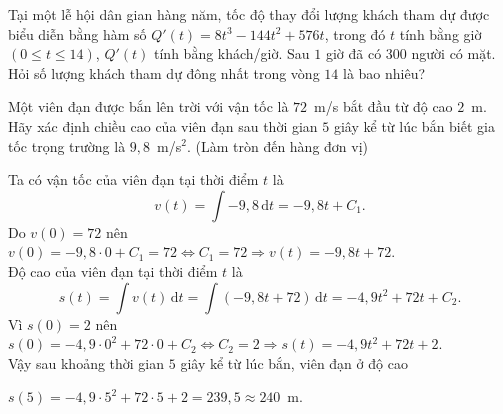 \begin{ex}%
Tại một lễ hội dân gian hàng năm, tốc độ thay đổi lượng khách tham dự được biểu diễn bằng hàm số $Q'(t)=8t^3-144t^2+576t$, trong đó $t$ tính bằng giờ $(0\leq t \leq 14)$, $Q'(t)$ tính bằng khách/giờ. Sau $1$ giờ đã có $300$ người có mặt. Hỏi số lượng khách tham dự đông nhất trong vòng $14$ là bao nhiêu?
\end{ex}

\begin{ex}%
Một viên đạn được bắn lên trời với vận tốc là $72$~m/s bắt đầu từ độ cao $2$~m. Hãy xác định chiều cao của viên đạn sau thời gian $5$ giây kể từ lúc bắn biết gia tốc trọng trường là $9{,}8$~m/s$^2$. (Làm tròn đến hàng đơn vị)
\loigiai
{
Ta có vận tốc của viên đạn tại thời điểm $t$ là \[v(t)=\displaystyle\int -9{,}8\mathrm{\,d}t=-9{,}8t+C_1.\]
Do $v(0)=72$ nên $v(0)=-9{,}8\cdot 0+C_1=72\Leftrightarrow C_1=72\Rightarrow v(t)=-9{,}8t+72$.\\
Độ cao của viên đạn tại thời điểm $t$ là \[s(t)=\displaystyle\int v(t)\mathrm{\,d}t=\displaystyle\int (-9{,}8t+72)\mathrm{\,d}t=-4{,}9t^2+72t+C_2.\]
Vì $s(0)=2$ nên $s(0)=-4{,}9\cdot 0^2+72\cdot 0+C_2\Leftrightarrow C_2=2\Rightarrow s(t)=-4{,}9t^2+72t+2$.\\
Vậy sau khoảng thời gian $5$ giây kể từ lúc bắn, viên đạn ở độ cao\\ \centerline{$s(5)=-4{,}9\cdot 5^2+72\cdot 5+2=239{,}5 \approx 240$~m.}
}
\end{ex}

